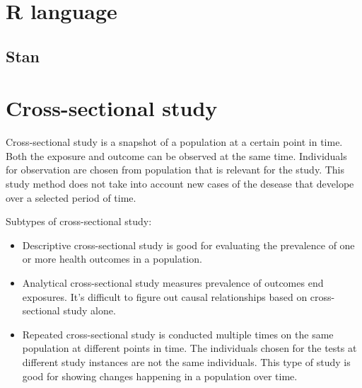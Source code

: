 \section{R language}\label{Rlanguage}
\subsection{Stan}\label{Stan}

\section{Cross-sectional study}\label{CrossSectionalStudy}
Cross-sectional study is a snapshot of a population at a certain point in time. Both the exposure and outcome can be observed at the same time. Individuals for observation are chosen from population that is relevant for the study. This study method does not take into account new cases of the desease that develope over a selected period of time. 

Subtypes of cross-sectional study:
\begin{itemize}
    \item Descriptive cross-sectional study is good for evaluating the prevalence of one or more health outcomes in a population.
    \item Analytical cross-sectional study measures prevalence of outcomes end exposures.  It's difficult to figure out causal relationships based on cross-sectional study alone. 
    \item Repeated cross-sectional study is conducted multiple times on the same population at different points in time. The individuals chosen for the tests at different study instances are not the same individuals. This type of study is good for showing changes happening in a population over time.
\end{itemize}
\cite{Wang2020CrossSectionalSS} 

